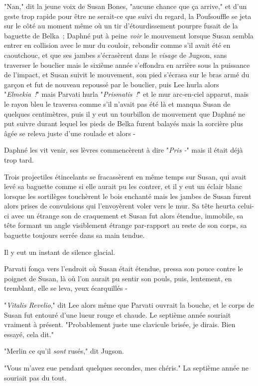 "Nan," dit la jeune voix de Susan Bones, "aucune chance que ça arrive," et d'un geste trop rapide pour être ne serait-ce que suivi du regard, la Poufsouffle se jeta sur le côté au moment même où un tir d'étourdissement pourpre fusait de la baguette de Belka~; Daphné put à peine \emph{voir} le mouvement lorsque Susan sembla entrer en collision avec le mur du couloir, rebondir comme s'il avait été en caoutchouc, et que ses jambes s'écrasèrent dans le \emph{visage} de Jugson, sans traverser le bouclier mais le sixième année s'effondra en arrière sous la puissance de l'impact, et Susan suivit le mouvement, son pied s'écrasa sur le bras armé du garçon et fut de nouveau repoussé par le bouclier, puis Lee hurla alors "\emph{Elmekia~!}" mais Parvati hurla "\emph{Prismatis~!}" et le mur arc-en-ciel apparut, mais le rayon bleu le traversa comme s'il n'avait pas été là et manqua Susan de quelques centimètres, puis il y eut un tourbillon de mouvement que Daphné ne put suivre durant lequel les pieds de Belka furent balayés mais la sorcière plus âgée se releva juste d'une roulade et alors -

Daphné les vit venir, ses lèvres commencèrent à dire "\emph{Pris -}" mais il était déjà trop tard.

Trois projectiles étincelants se fracassèrent en même temps sur Susan, qui avait levé sa baguette comme si elle aurait pu les contrer, et il y eut un éclair blanc lorsque les sortilèges touchèrent le bois enchanté mais les jambes de Susan furent alors prises de convulsions qui l'envoyèrent voler vers le mur. Sa tête heurta celui-ci avec un étrange son de craquement et Susan fut alors étendue, immobile, sa tête formant un angle visiblement étrange par-rapport au reste de son corps, sa baguette toujours serrée dans sa main tendue.

Il y eut un instant de silence glacial.

Parvati fonça vers l'endroit où Susan était étendue, pressa son pouce contre le poignet de Susan, là où l'on aurait pu sentir son pouls, puis, lentement, en tremblant, elle se leva, yeux écarquillés -

"\emph{Vitalis Revelio}," dit Lee alors même que Parvati ouvrait la bouche, et le corps de Susan fut entouré d'une lueur rouge et chaude. Le septième année souriait vraiment à présent. "Probablement juste une clavicule brisée, je dirais. Bien essayé, cela dit."

"Merlin ce qu'il \emph{sont} rusés," dit Jugson.

"Vous m'avez eue pendant quelques secondes, mes chéris." La septième année ne souriait pas du tout.


